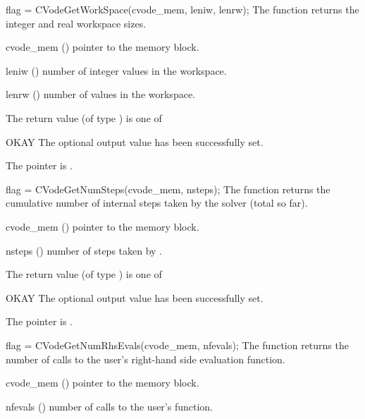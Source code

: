 {}
{
  flag = CVodeGetWorkSpace(cvode\_mem, leniw, lenrw);
}
{
  The function  returns the
  {\cvode} integer and real workspace sizes.
}
{
  \begin{args}
  \item[cvode\_mem] ()
    pointer to the {\cvode} memory block.
  \item[leniw] ()
    number of integer values in the {\cvode} workspace.
  \item[lenrw] ()
    number of  values in the {\cvode} workspace.
  \end{args}
}
{
  The return value  (of type ) is one of
  \begin{args}
  \item[OKAY] 
    The optional output value has been successfully set.
  \item[\Id{CVG\_NO\_MEM}]
    The  pointer is .
  \end{args}
}
{}
{
  flag = CVodeGetNumSteps(cvode\_mem, nsteps);
}
{
  The function  returns the cumulative number of internal 
  steps taken by the solver (total so far).
}
{
  \begin{args}
  \item[cvode\_mem] ()
    pointer to the {\cvode} memory block.
  \item[nsteps] ()
    number of steps taken by {\cvode}.
  \end{args}
}
{
  The return value  (of type ) is one of
  \begin{args}
  \item[OKAY] 
    The optional output value has been successfully set.
  \item[\Id{CVG\_NO\_MEM}]
    The  pointer is .
  \end{args}
}
{}
{
  flag = CVodeGetNumRhsEvals(cvode\_mem, nfevals);
}
{
  The function  returns the 
  number of calls to the user's right-hand side evaluation function.
}
{
  \begin{args}
  \item[cvode\_mem] ()
    pointer to the {\cvode} memory block.
  \item[nfevals] ()
    number of calls to the user's  function.
  \end{args}
}
